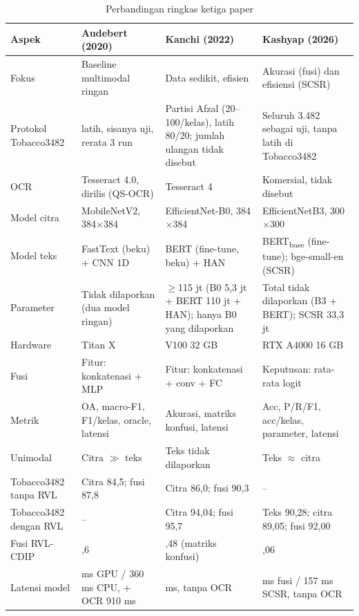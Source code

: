 \begin{table}[H]
  \centering
  \caption{Perbandingan ringkas ketiga paper}
  \label{tab:banding}
  \fontsize{9}{11}\selectfont
  \begin{tabularx}{\textwidth}{|l|>{\raggedright\arraybackslash}X|>{\raggedright\arraybackslash}X|>{\raggedright\arraybackslash}X|}
    \hline
    \textbf{Aspek} & \textbf{Audebert (2020)} & \textbf{Kanchi (2022)} & \textbf{Kashyap (2026)} \\ \hline
    Fokus & Baseline multimodal ringan & Data sedikit, efisien & Akurasi (fusi) dan efisiensi (SCSR) \\ \hline
    Protokol Tobacco3482 & 800 latih, sisanya uji, rerata 3 run & Partisi Afzal (20--100/kelas), latih 80/20; jumlah ulangan tidak disebut & Seluruh 3.482 sebagai uji, tanpa latih di Tobacco3482 \\ \hline
    OCR & Tesseract 4.0, dirilis (QS-OCR) & Tesseract 4 & Komersial, tidak disebut \\ \hline
    Model citra & MobileNetV2, 384$\times$384 & EfficientNet-B0, 384$\times$384 & EfficientNetB3, 300$\times$300 \\ \hline
    Model teks & FastText (beku) + CNN 1D & BERT (fine-tune, beku) + HAN & BERT\textsubscript{base} (fine-tune); bge-small-en (SCSR) \\ \hline
    Parameter & Tidak dilaporkan (dua model ringan) & $\geq$115 jt (B0 5,3 jt + BERT 110 jt + HAN); hanya B0 yang dilaporkan & Total tidak dilaporkan (B3 + BERT); SCSR 33,3 jt \\ \hline
    Hardware & Titan X & V100 32 GB & RTX A4000 16 GB \\ \hline
    Fusi & Fitur: konkatenasi + MLP & Fitur: konkatenasi + conv + FC & Keputusan: rata-rata logit \\ \hline
    Metrik & OA, macro-F1, F1/kelas, oracle, latensi & Akurasi, matriks konfusi, latensi & Acc, P/R/F1, acc/kelas, parameter, latensi \\ \hline
    Unimodal & Citra $\gg$ teks & Teks tidak dilaporkan & Teks $\approx$ citra \\ \hline
    Tobacco3482 tanpa RVL & Citra 84,5; fusi 87,8 & Citra 86,0; fusi 90,3 & -- \\ \hline
    Tobacco3482 dengan RVL & -- & Citra 94,04; fusi 95,7 & Teks 90,28; citra 89,05; fusi 92,00 \\ \hline
    Fusi RVL-CDIP & 90,6 & 95,48 (matriks konfusi) & 93,06 \\ \hline
    Latensi model & 110 ms GPU / 360 ms CPU, + OCR 910 ms & 105 ms, tanpa OCR & 184 ms fusi / 157 ms SCSR, tanpa OCR \\ \hline

\end{tabularx}
\end{table}

